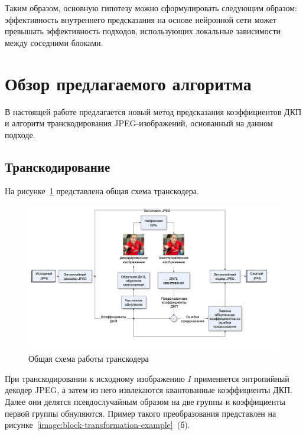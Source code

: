 \documentclass[times,specification,annotation]{itmo-student-thesis}
\begin{document}
Таким образом, основную гипотезу можно сформулировать следующим образом: эффективность внутреннего предсказания на основе нейронной сети может превышать эффективность подходов, использующих локальные зависимости между соседними блоками.

\section{Обзор предлагаемого алгоритма}\label{section:algorithm-overview}

В настоящей работе предлагается новый метод предсказания коэффициентов ДКП и алгоритм транскодирования JPEG-изображений, основанный на данном подходе.

\subsection{Транскодирование}\label{subsection:transcoding-overview}

На рисунке~\ref{encoder-scheme} представлена общая схема транскодера.

\begin{figure}[!h]
    \centering
    \includegraphics[width=\textwidth]{./images/encoder-scheme.png}
    \caption{Общая схема работы транскодера}
    \label{encoder-scheme}
\end{figure}

При транскодировании к исходному изображению $I$ применяется энтропийный декодер JPEG, а затем из него извлекаются квантованные коэффициенты ДКП. Далее они делятся псевдослучайным образом на две группы и коэффициенты первой группы обнуляются. Пример такого преобразования представлен на рисунке~\ref{image:block-transformation-example}~(б).\par
\end{document}
